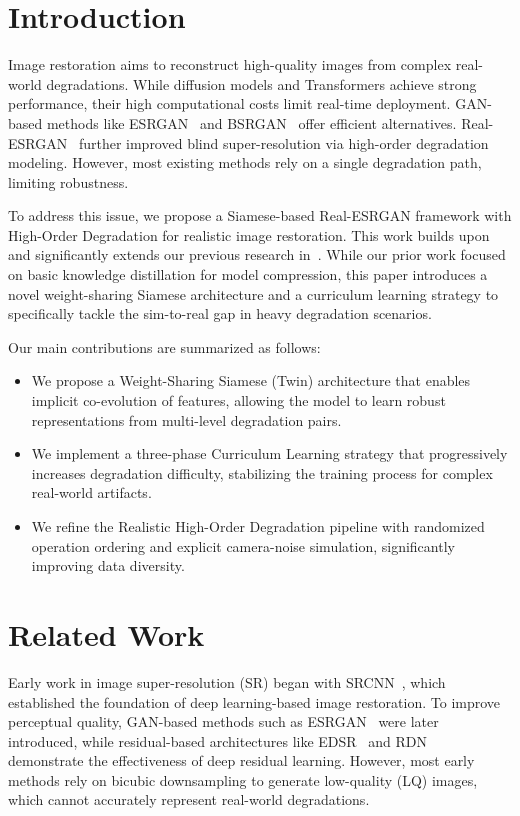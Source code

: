 \documentclass[conference]{IEEEtran}
\begin{document}
\section{Introduction}


Image restoration aims to reconstruct high-quality images from complex real-world degradations. While diffusion models and Transformers achieve strong performance, their high computational costs limit real-time deployment. GAN-based methods like ESRGAN~\cite{wang2018esrgan} and BSRGAN~\cite{zhang2021designing} offer efficient alternatives. Real-ESRGAN~\cite{wang2021realesrgan} further improved blind super-resolution via high-order degradation modeling. However, most existing methods rely on a single degradation path, limiting robustness.

To address this issue, we propose a Siamese-based Real-ESRGAN framework with High-Order Degradation for realistic image restoration. This work builds upon and significantly extends our previous research in~\cite{11309534}. While our prior work focused on basic knowledge distillation for model compression, this paper introduces a novel weight-sharing Siamese architecture and a curriculum learning strategy to specifically tackle the sim-to-real gap in heavy degradation scenarios.

Our main contributions are summarized as follows:
\begin{itemize}
    \item We propose a Weight-Sharing Siamese (Twin) architecture that enables implicit co-evolution of features, allowing the model to learn robust representations from multi-level degradation pairs.
    \item We implement a three-phase Curriculum Learning strategy that progressively increases degradation difficulty, stabilizing the training process for complex real-world artifacts.
    \item We refine the Realistic High-Order Degradation pipeline with randomized operation ordering and explicit camera-noise simulation, significantly improving data diversity.
\end{itemize}

\section{Related Work}

Early work in image super-resolution (SR) began with SRCNN~\cite{dong2014learning}, which established the foundation of deep learning-based image restoration. To improve perceptual quality, GAN-based methods such as ESRGAN~\cite{wang2018esrgan} were later introduced, while residual-based architectures like EDSR~\cite{lim2017enhanced} and RDN~\cite{zhang2018residual} demonstrate the effectiveness of deep residual learning. However, most early methods rely on bicubic downsampling to generate low-quality (LQ) images, which cannot accurately represent real-world degradations.
\end{document}
